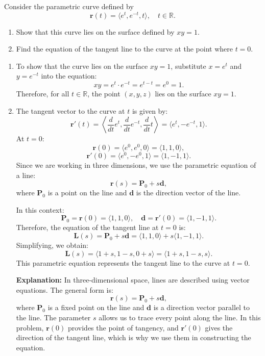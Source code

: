 \exampleline
\begin{example}
Consider the parametric curve defined by
\[
\mathbf{r}(t) = \langle e^t, e^{-t}, t \rangle, \quad t \in \mathbb{R}.
\]
\begin{enumerate}
    \item Show that this curve lies on the surface defined by \( x y = 1 \).
    \item Find the equation of the tangent line to the curve at the point where \( t = 0 \).
\end{enumerate}
\begin{solution}
\begin{enumerate}
    \item To show that the curve lies on the surface \( x y = 1 \), substitute \( x = e^t \) and \( y = e^{-t} \) into the equation:
    \[
    x y = e^t \cdot e^{-t} = e^{t - t} = e^0 = 1.
    \]
    Therefore, for all \( t \in \mathbb{R} \), the point \( (x, y, z) \) lies on the surface \( x y = 1 \).

    \item The tangent vector to the curve at \( t \) is given by:
    \[
    \mathbf{r}'(t) = \left\langle \frac{d}{dt} e^t, \frac{d}{dt} e^{-t}, \frac{d}{dt} t \right\rangle = \langle e^t, -e^{-t}, 1 \rangle.
    \]
    At \( t = 0 \):
    \[
    \mathbf{r}(0) = \langle e^0, e^{0}, 0 \rangle = \langle 1, 1, 0 \rangle,
    \]
    \[
    \mathbf{r}'(0) = \langle e^0, -e^{0}, 1 \rangle = \langle 1, -1, 1 \rangle.
    \]
    Since we are working in three dimensions, we use the parametric equation of a line:
    \[
    \mathbf{r}(s) = \mathbf{P}_0 + s \mathbf{d},
    \]
    where \( \mathbf{P}_0 \) is a point on the line and \( \mathbf{d} \) is the direction vector of the line.

    In this context:
    \[
    \mathbf{P}_0 = \mathbf{r}(0) = \langle 1, 1, 0 \rangle, \quad \mathbf{d} = \mathbf{r}'(0) = \langle 1, -1, 1 \rangle.
    \]
    Therefore, the equation of the tangent line at \( t = 0 \) is:
    \[
    \mathbf{L}(s) = \mathbf{P}_0 + s \mathbf{d} = \langle 1, 1, 0 \rangle + s \langle 1, -1, 1 \rangle.
    \]
    Simplifying, we obtain:
    \[
    \mathbf{L}(s) = \langle 1 + s, 1 - s, 0 + s \rangle = \langle 1 + s, 1 - s, s \rangle.
    \]
    This parametric equation represents the tangent line to the curve at \( t = 0 \).

    \textbf{Explanation:} In three-dimensional space, lines are described using vector equations. The general form is:
    \[
    \mathbf{r}(s) = \mathbf{P}_0 + s \mathbf{d},
    \]
    where \( \mathbf{P}_0 \) is a fixed point on the line and \( \mathbf{d} \) is a direction vector parallel to the line. The parameter \( s \) allows us to trace every point along the line. In this problem, \( \mathbf{r}(0) \) provides the point of tangency, and \( \mathbf{r}'(0) \) gives the direction of the tangent line, which is why we use them in constructing the equation.
\end{enumerate}
\end{solution}
\end{example}
\exampleline




